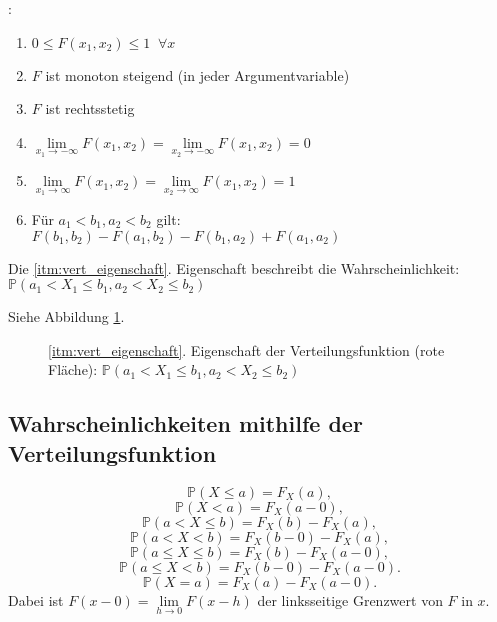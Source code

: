 {    \begin{definition}:\\
    \begin{enumerate}[1)]
        \item  $0\le F\left(x_1,x_2\right)\le 1\;\;\forall x$
        \item  $F$ ist monoton steigend (in jeder Argumentvariable)
        \item $F$ ist rechtsstetig
        \item $\lim\limits_{x_1\rightarrow-\infty}F(x_1,x_2)=\lim\limits_{x_2\rightarrow-\infty}F(x_1,x_2)=0$
        \item $\lim\limits_{x_1\rightarrow\infty}F(x_1,x_2)=\lim\limits_{x_2\rightarrow\infty}F(x_1,x_2)=1$
        \item Für $a_{1}<b_{1},a_{2}<b_{2}$ gilt:\label{itm:vert_eigenschaft}\\
        $F\left(b_{1},b_{2}\right)-F\left(a_{1},b_{2}\right)-F\left(b_{1},a_{2}\right)+F(a_{1},a_{2})$
    \end{enumerate}
    \end{definition}

    Die \ref{itm:vert_eigenschaft}. Eigenschaft beschreibt die Wahrscheinlichkeit: \\ 
    $\mathbb P\left(a_{1}<X_{1}\le b_{1},a_{2}<X_{2}\leq b_{2}\right)$

    Siehe Abbildung \ref{fig:vert_eigenschaft}.

    \begin{figure}
    \centering
        \begin{tikzpicture}
            
        \end{tikzpicture}
        \caption{\ref{itm:vert_eigenschaft}. Eigenschaft der Verteilungsfunktion (rote Fläche): ${\mathbb{P}(a_1< X_1\leq b_1,a_2<X_2\leq b_2)}$}
        \label{fig:vert_eigenschaft}
    \end{figure}

    \subsection{Wahrscheinlichkeiten mithilfe der Verteilungsfunktion}\label{sec:wahrscheinlichkeiten_verteilungsfunktionen}
    \[\mathbb P(X\le a)=F_X(a),\]
    \[\mathbb P(X<a)=F_X(a-0),\]
    \[\mathbb P(a< X\le b)=F_X(b)-F_X(a),\]
    \[\mathbb P(a< X< b)=F_X(b-0)-F_X(a),\]
    \[\mathbb P(a\le X\le b)=F_X(b)-F_X(a-0),\]
    \[\mathbb P(a\le X< b)=F_X(b-0)-F_X(a-0).\]
    \[\mathbb P( X= a)=F_X(a)-F_X(a-0).\]
    Dabei ist $F(x-0)=\lim\limits_{h\rightarrow 0}F(x-h)$ der linksseitige Grenzwert
    von $F$ in $x$.

}
